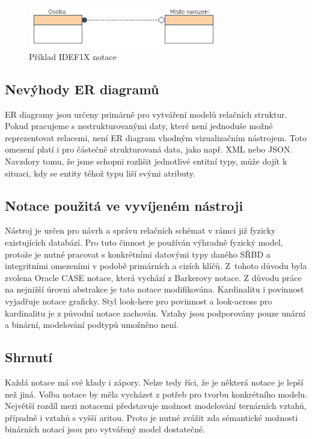 \documentclass[czech,bachelor,public,dept460,male,oneside]{diploma}
\begin{document}
		\begin{figure}[!h]
			\centering
			\includegraphics[width=0.75\textwidth]{Figures/NotationExIDEF1X}
			\caption[Příklad IDEF1X notace]{Příklad IDEF1X notace \cite{whatIsERD}}
			\label{fig:notationExIDEF1X}
		\end{figure}
	
	\subsection{Nevýhody ER diagramů}
	ER diagramy jsou určeny primárně pro vytváření modelů relačních struktur. Pokud pracujeme s nestrukturovanými daty, které není jednoduše možné reprezentovat relacemi, není ER diagram vhodným vizualizačním nástrojem. Toto omezení platí i pro částečně strukturovaná data, jako např. XML nebo JSON. Navzdory tomu, že jsme schopni rozlišit jednotlivé entitní typy, může dojít k situaci, kdy se entity téhož typu liší svými atributy. 
	
	\subsection{Notace použitá ve vyvíjeném nástroji}
	Nástroj je určen pro návrh a správu relačních schémat v rámci již fyzicky existujících databází. Pro tuto činnost je používán výhradně fyzický model, protože je nutné pracovat s konkrétními datovými typy daného SŘBD a integritními omezeními v podobě primárních a cizích klíčů. Z~tohoto důvodu byla zvolena Oracle CASE notace, která vychází z Barkerovy notace. Z důvodu práce na nejnižší úrovni abstrakce je tato notace modifikována. Kardinalitu i povinnost vyjadřuje notace graficky. Styl look-here pro povinnost a look-across pro kardinalitu je z původní notace zachován. Vztahy jsou podporovány pouze unární a binární, modelování podtypů umožněno není.
	
	\subsection{Shrnutí}
	Každá notace má své klady i zápory. Nelze tedy říci, že je některá notace je lepší než jiná. Volba notace by měla vycházet z potřeb pro tvorbu konkrétního modelu. Největší rozdíl mezi notacemi představuje možnost modelování ternárních vztahů, případně i vztahů s vyšší aritou. Proto je nutné zvážit zda sémantické možnosti binárních notací jsou pro vytvářený model dostatečné. 
	
\end{document}
